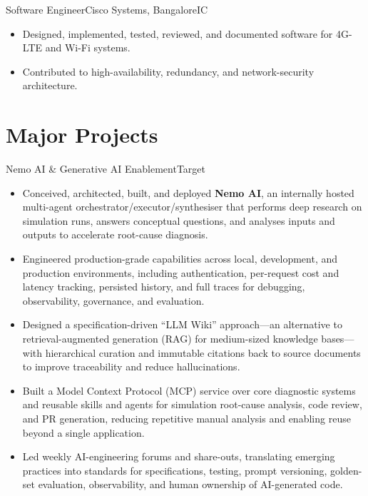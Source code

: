 \documentclass[11pt,a4paper]{moderncv}
\begin{document}
    {Software Engineer}{Cisco Systems, Bangalore}{}{IC}{
    \begin{itemize}
        \item Designed, implemented, tested, reviewed, and documented software for 4G-LTE and Wi-Fi systems.
        \item Contributed to high-availability, redundancy, and network-security architecture.
    \end{itemize}
    }


\hypertarget{major-projects}{
\section{Major Projects}\label{major-projects}}

\nopagebreak
    {Nemo AI \& Generative AI Enablement}{Target}{}{}{
    \begin{itemize}
        \item Conceived, architected, built, and deployed \textbf{Nemo AI}, an internally hosted multi-agent orchestrator/executor/synthesiser that performs deep research on simulation runs, answers conceptual questions, and analyses inputs and outputs to accelerate root-cause diagnosis.
        \item Engineered production-grade capabilities across local, development, and production environments, including authentication, per-request cost and latency tracking, persisted history, and full traces for debugging, observability, governance, and evaluation.
        \item Designed a specification-driven ``LLM Wiki'' approach---an alternative to retrieval-augmented generation (RAG) for medium-sized knowledge bases---with hierarchical curation and immutable citations back to source documents to improve traceability and reduce hallucinations.
        \item Built a Model Context Protocol (MCP) service over core diagnostic systems and reusable skills and agents for simulation root-cause analysis, code review, and PR generation, reducing repetitive manual analysis and enabling reuse beyond a single application.
        \item Led weekly AI-engineering forums and share-outs, translating emerging practices into standards for specifications, testing, prompt versioning, golden-set evaluation, observability, and human ownership of AI-generated code.
    \end{itemize}
    }
\end{document}
